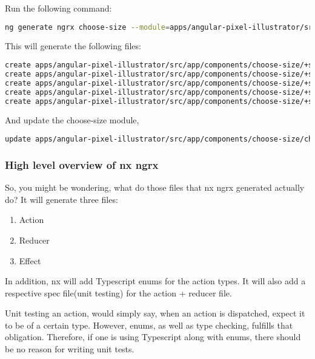 Run the following command:
\begin{lstlisting}[language=Bash]
ng generate ngrx choose-size --module=apps/angular-pixel-illustrator/src/app/components/choose-size/choose-size.module.ts
\end{lstlisting}

This will generate the following files:
\begin{lstlisting}[language=Bash]
create apps/angular-pixel-illustrator/src/app/components/choose-size/+state/choose-size.actions.ts (684 bytes)
create apps/angular-pixel-illustrator/src/app/components/choose-size/+state/choose-size.reducer.ts (869 bytes)
create apps/angular-pixel-illustrator/src/app/components/choose-size/+state/choose-size.effects.ts (859 bytes)
create apps/angular-pixel-illustrator/src/app/components/choose-size/+state/choose-size.effects.spec.ts (1070 bytes)
create apps/angular-pixel-illustrator/src/app/components/choose-size/+state/choose-size.reducer.spec.ts (364 bytes)
\end{lstlisting}
And update the choose-size module,
\begin{lstlisting}[language=Bash]
update apps/angular-pixel-illustrator/src/app/components/choose-size/choose-size.module.ts
\end{lstlisting}

\subsubsection{ High level overview of nx ngrx }
So, you might be wondering, what do those files that nx ngrx generated actually
do? It will generate three files:
\begin{enumerate}
  \item Action
  \item Reducer
  \item Effect
\end{enumerate}

In addition, nx will add Typescript enums for the action types. It will also
add a respective spec file(unit testing) for the action + reducer file.

\colorbox{darkgray}{\color{white}{Unit testing Actions?}}

Unit testing an action, would simply say, when an action is dispatched, expect
it to be of a certain type. However, enums, as well as type checking, fulfills
that obligation. Therefore, if one is using Typescript along with enums, there
should be no reason for writing unit tests.
